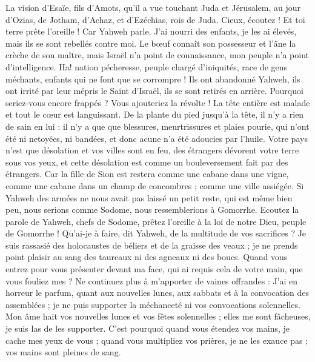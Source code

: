 \begin{multicols}{2}
\VerseOne{}La vision d'Esaïe, fils d'Amots, qu'il a vue touchant Juda et Jérusalem, au jour d'Ozias, de Jotham, d'Achaz, et d'Ezéchias, rois de Juda.
Cieux, écoutez ! Et toi terre prête l'oreille ! Car Yahweh parle. J'ai nourri des enfants, je les ai élevés, mais ils se sont rebellés contre moi.
Le bœuf connaît son possesseur et l'âne la crèche de son maître, mais Israël n'a point de connaissance, mon peuple n'a point d'intelligence.
Ha! nation pécheresse, peuple chargé d'iniquités, race de gens méchants, enfants qui ne font que se corrompre ! Ils ont abandonné Yahweh, ils ont irrité par leur mépris le Saint d'Israël, ils se sont retirés en arrière.
Pourquoi seriez-vous encore frappés ? Vous ajouteriez la révolte ! La tête entière est malade et tout le cœur est languissant.
De la plante du pied jusqu'à la tête, il n'y a rien de sain en lui : il n'y a que que blessures, meurtrissures et plaies pourie, qui n'ont été ni netoyées, ni bandées, et donc acune n'a été adoucies par l'huile.
Votre pays n'est que désolation et vos villes sont en feu, des étrangers dévorent votre terre sous vos yeux, et cette désolation est comme un bouleversement fait par des étrangers.
Car la fille de Sion est restera comme une cabane dans une vigne, comme une cabane dans un champ de concombres ; comme une ville assiégée.
Si Yahweh des armées ne nous avait pas laissé un petit reste, qui est même bien peu, nous serions comme Sodome, nous ressemblerions à Gomorrhe.
Ecoutez la parole de Yahweh, chefs de Sodome, prêtez l'oreille à la loi de notre Dieu, peuple de Gomorrhe !
Qu'ai-je à faire, dit Yahweh, de la multitude de vos sacrifices ? Je suis rassasié des holocaustes de béliers et de la graisse des veaux ; je ne prends point plaisir au sang des taureaux ni des agneaux ni des boucs.
Quand vous entrez pour vous présenter devant ma face, qui ai requis cela de votre main, que vous fouliez mes ?
Ne continuez plus à m'apporter de vaines offrandes : J'ai en horreur le parfum, quant aux nouvelles lunes,  aux sabbats et à la convocation des assemblées ; je ne puis supporter la méchanceté ni vos convocations solennelles.
Mon âme hait vos nouvelles lunes et vos fêtes solennelles ; elles me sont fâcheuses, je suis las de les supporter.
C'est pourquoi quand vous étendez vos mains, je cache mes yeux de vous ; quand vous multipliez vos prières, je ne les exauce pas ; vos mains sont pleines de sang.

\end{multicols}
